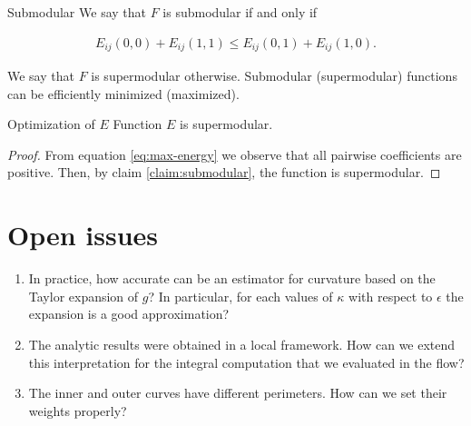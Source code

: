 \begin{claim}{Submodular} \label{claim:submodular}
 We say that $F$ is submodular if and only if 
 
 \begin{align*}
	E_{ij}(0,0) + E_{ij}(1,1) \leq E_{ij}(0,1) + E_{ij}(1,0).
 \end{align*}
\end{claim}

We say that $F$ is supermodular otherwise. Submodular (supermodular) functions can be efficiently minimized (maximized).

%
%

\begin{claim}{Optimization of $E$}
	Function $E$ is supermodular.
\end{claim}

\begin{proof}
	From equation \eqref{eq:max-energy} we observe that all pairwise coefficients are positive. Then, by claim \ref{claim:submodular}, the function is supermodular.
\end{proof}


\section{Open issues}

\begin{enumerate}
	\item{In practice, how accurate can be an estimator for curvature based on the Taylor expansion of $g$? In particular, for each values of $\kappa$ with respect to $\epsilon$ the expansion is a good approximation?}
	\item{The analytic results were obtained in a local framework. How can we extend this interpretation for the integral computation that we evaluated in the flow?}
	\item{The inner and outer curves have different perimeters. How can we set their weights properly?}
\end{enumerate}


